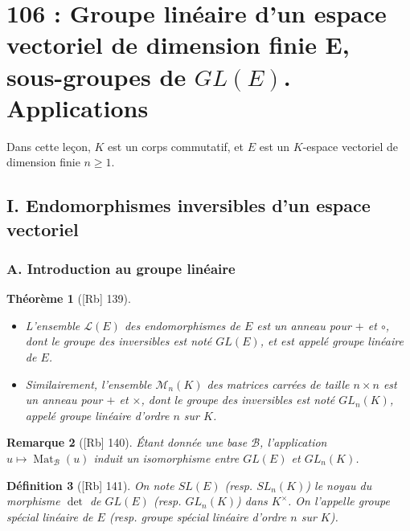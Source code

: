 \documentclass[10pt, a4paper, parskip=full, twoside, twocolumn]{report}
\newtheorem{definition}{Définition}
\newtheorem{theorem}[definition]{Théorème}
\newtheorem{remark}[definition]{Remarque}
\DeclareMathOperator{\Mat}{Mat}
\begin{document}
\chapter*{106 : Groupe linéaire d'un espace vectoriel de dimension finie E, sous-groupes de $GL(E)$. Applications}
\setcounter{definition}{0}

Dans cette leçon, $K$ est un corps commutatif, et $E$ est un $K$-espace vectoriel de dimension finie $n\geq 1$.
\section*{I. Endomorphismes inversibles d'un espace vectoriel}
\subsection*{A. Introduction au groupe linéaire}
\begin{theorem}[\textnormal{[Rb] 139}]
	\begin{itemize}
		\item L'ensemble $\mathcal{L}(E)$ des endomorphismes de $E$ est un anneau pour $+$ et $\circ$, dont le groupe des inversibles est noté $GL(E)$, et est appelé \emph{groupe linéaire} de $E$.
		\item Similairement, l'ensemble $\mathcal{M}_n(K)$ des matrices carrées de taille $n\times n$ est un anneau pour $+$ et $\times$, dont le groupe des inversibles est noté $GL_n(K)$, appelé \emph{groupe linéaire d'ordre $n$ sur $K$}.
	\end{itemize}
\end{theorem}

\begin{remark}[\textnormal{[Rb] 140}]
	Étant donnée une base $\mathcal{B}$, l'application $u\mapsto \Mat_{\mathcal{B}}(u)$ induit un isomorphisme entre $GL(E)$ et $GL_n(K)$.
\end{remark}

\begin{definition}[\textnormal{[Rb] 141}]
	On note $SL(E)$ (resp. $SL_n(K)$) le noyau du morphisme $\det$ de $GL(E)$ (resp. $GL_n(K)$) dans $K^{\times}$.
	On l'appelle \emph{groupe spécial linéaire de $E$} (resp. \emph{groupe spécial linéaire d'ordre $n$ sur $K$}).
\end{definition}
\end{document}
